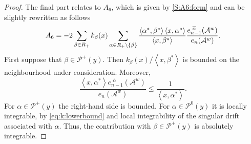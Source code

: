 \documentclass{article}
\numberwithin{equation}{section}
\newcommand{\Aa}{\mathcal{A}^{w}}
\newcommand{\xas}{\left<x,\alpha^*\right>}
\newcommand{\xbs}{\left<x,\beta^*\right>}
\newcommand{\aR}{\alpha\in R_+}
\newcommand{\bR}{\beta\in R_+}
\newcommand{\SaRnb}{\sum_{\aR\backslash\{\beta\}}}
\newcommand{\abs}{\left<\alpha^*,\beta^*\right>}
\newcommand{\shift}{\,\,}
\newcommand{\eA}[1]{e_{#1}(\Aa)}
\newcommand{\eaA}[1]{e_{#1}^{\shift\overline{\alpha}}(\Aa)}
\newcommand{\Pzero}{\mathcal{P}^0(y)}
\newcommand{\Pplus}{\mathcal{P}^+(y)}
\theoremstyle{plain}
\begin{document}
\begin{proof}
    \medskip

 The final part relates to $A_6$, which is given by \eqref{S:A6:form} and can be slightly rewritten as follows
 \begin{equation*}
    A_6 = - 2\sum_{\bR} k_\beta(x)\SaRnb	\frac{\abs\xas}{\xbs} \frac{\eaA{n-1}}{\eA{n}}\/.
 \end{equation*}
 First suppose that $\beta\in\Pplus$. Then $k_\beta(x)/\xbs$ is bounded on the neighbourhood under consideration. Moreover,
    \begin{equation*}
        \frac{\xas\eaA{n-1}}{\eA{n}} \leq\frac{1}{\xas}.
    \end{equation*}
For $\alpha\in\Pplus$ the right-hand side is bounded. For $\alpha\in\Pzero$ it is locally integrable, by \ref{eq:k:lowerbound} and local integrability of the singular drift associated with $\alpha$. Thus, the contribution with $\beta\in\Pplus$ is absolutely integrable.
 

\end{proof}
\end{document}
